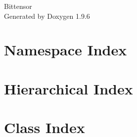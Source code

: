 \documentclass[twoside]{book}
\newcommand{\+}{\discretionary{\mbox{\scriptsize$\hookleftarrow$}}{}{}}
\newcommand{\clearemptydoublepage}{%
    \newpage{\pagestyle{empty}\cleardoublepage}%
  }
\begin{document}
  \raggedbottom
    \hypersetup{pageanchor=false,
                bookmarksnumbered=true,
                pdfencoding=unicode
               }
  \begin{titlepage}
  \vspace*{7cm}
  \begin{center}%
  {\Large Bittensor}\\
  \vspace*{1cm}
  {\large Generated by Doxygen 1.9.6}\\
  \end{center}
  \end{titlepage}
  \clearemptydoublepage
  \tableofcontents
  \clearemptydoublepage
  \hypersetup{pageanchor=true}
\chapter{Namespace Index}

\chapter{Hierarchical Index}

\chapter{Class Index}

\end{document}
